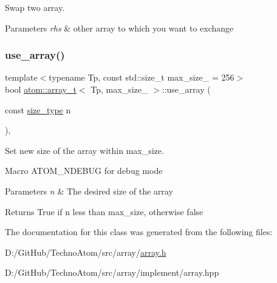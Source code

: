 Swap two array. 


\begin{DoxyParams}{Parameters}
{\em rhs} & other array to which you want to exchange \\
\hline
\end{DoxyParams}
\mbox{\label{classatom_1_1array__t_a44737f61d6cac6e2a65fbee06b702755}} 
\subsubsection{\texorpdfstring{use\+\_\+array()}{use\_array()}}
{\footnotesize\ttfamily template$<$typename Tp, const std\+::size\+\_\+t max\+\_\+size\+\_\+ = 256$>$ \\
bool \hyperlink{classatom_1_1array__t}{atom\+::array\+\_\+t}$<$ Tp, max\+\_\+size\+\_\+ $>$\+::use\+\_\+array (\begin{DoxyParamCaption}\item[{const \hyperlink{classatom_1_1array__t_a8534f23c7f0082698cbd708e1f2e26ff}{size\+\_\+type}}]{n }\end{DoxyParamCaption})\hspace{0.3cm}{\ttfamily [inline]}, {\ttfamily [noexcept]}}



Set new size of the array within max\+\_\+size. 

Macro A\+T\+O\+M\+\_\+\+N\+D\+E\+B\+UG for debug mode 
\begin{DoxyParams}{Parameters}
{\em n} & The desired size of the array \\
\hline
\end{DoxyParams}
\begin{DoxyReturn}{Returns}
True if n less than max\+\_\+size, otherwise false 
\end{DoxyReturn}


The documentation for this class was generated from the following files\+:\begin{DoxyCompactItemize}
\item 
D\+:/\+Git\+Hub/\+Techno\+Atom/src/array/\hyperlink{array_8h}{array.\+h}\item 
D\+:/\+Git\+Hub/\+Techno\+Atom/src/array/implement/array.\+hpp\end{DoxyCompactItemize}
